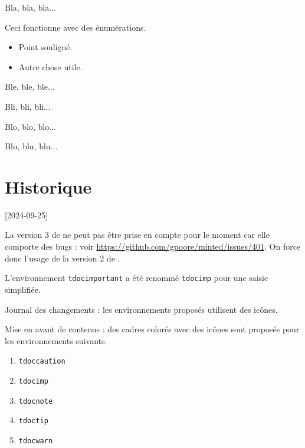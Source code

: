 \begin{tdoclatex}[sbs]
Bla, bla, bla...

\tdocsep %

Ceci fonctionne avec des énumérations.

\begin{itemize}
    \item Point souligné.

    \item Autre chose utile.
\end{itemize}

\tdocsep %

Ble, ble, ble...

Bli, bli, bli...

\tdocxspace %

Blo, blo, blo...

Blu, blu, blu...

\end{tdoclatex}


\section{Historique}

\small

[2024-09-25]

\begin{tdocprob}
	\item La version 3 de  ne peut pas être prise en compte pour le moment car elle comporte des bugs : voir \url{https://github.com/gpoore/minted/issues/401}. On force donc l'usage de la version 2 de .
\end{tdocprob}


\begin{tdocbreak}
	\item L'environnement \verb#tdocimportant# a été renommé \verb#tdocimp# pour une saisie simplifiée.
\end{tdocbreak}


\begin{tdocnew}
    \item Journal des changements : les environnements proposés utilisent des icônes.


    \item Mise en avant de contenus : des cadres colorés avec des icônes sont proposés pour les environnements suivants.
    \bgroup
    \setlength{\multicolsep}{3.0pt plus 1.0pt minus 0.75pt}
    \begin{multicols}{3}
        \begin{enumerate}
        	\item \verb#tdoccaution#
        	\item \verb#tdocimp#
        	\item \verb#tdocnote#
        	\item \verb#tdoctip#
        	\item \verb#tdocwarn#
        \end{enumerate}
    \end{multicols}
    \egroup
\end{tdocnew}

